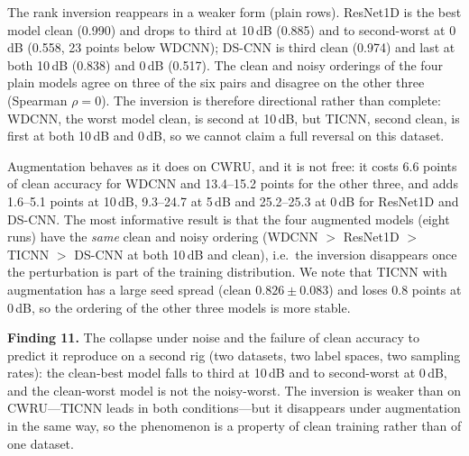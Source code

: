 The rank inversion reappears in a weaker form (plain rows). ResNet1D is the best model clean (0.990) and drops to third at 10\,dB (0.885) and to second-worst at 0\,dB (0.558, 23 points below WDCNN); DS-CNN is third clean (0.974) and last at both 10\,dB (0.838) and 0\,dB (0.517). The clean and noisy orderings of the four plain models agree on three of the six pairs and disagree on the other three (Spearman $\rho=0$). The inversion is therefore directional rather than complete: WDCNN, the worst model clean, is second at 10\,dB, but TICNN, second clean, is first at both 10\,dB and 0\,dB, so we cannot claim a full reversal on this dataset.

Augmentation behaves as it does on CWRU, and it is not free: it costs 6.6 points of clean accuracy for WDCNN and 13.4--15.2 points for the other three, and adds 1.6--5.1 points at 10\,dB, 9.3--24.7 at 5\,dB and 25.2--25.3 at 0\,dB for ResNet1D and DS-CNN. The most informative result is that the four augmented models (eight runs) have the \emph{same} clean and noisy ordering (WDCNN $>$ ResNet1D $>$ TICNN $>$ DS-CNN at both 10\,dB and clean), i.e.\ the inversion disappears once the perturbation is part of the training distribution. We note that TICNN with augmentation has a large seed spread (clean $0.826\pm0.083$) and loses 0.8 points at 0\,dB, so the ordering of the other three models is more stable.

\textbf{Finding 11.} The collapse under noise and the failure of clean accuracy to predict it reproduce on a second rig (two datasets, two label spaces, two sampling rates): the clean-best model falls to third at 10\,dB and to second-worst at 0\,dB, and the clean-worst model is not the noisy-worst. The inversion is weaker than on CWRU---TICNN leads in both conditions---but it disappears under augmentation in the same way, so the phenomenon is a property of clean training rather than of one dataset.

